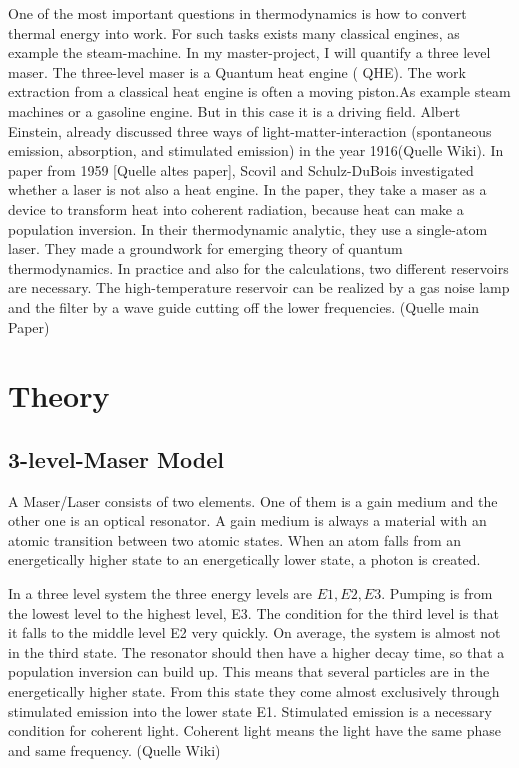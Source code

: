 \documentclass[12pt,a4paper]{article}
\begin{document}
One of the most important questions in thermodynamics is how to convert
thermal energy into work. For such tasks exists many classical engines, as
example the steam-machine. %
 In my master-project, I will quantify a three level maser.
The three-level maser is a Quantum heat engine ( QHE). The work
extraction from a classical heat engine is often a moving piston.As example steam machines or a gasoline engine. But in this case
it is a driving field. Albert Einstein, already discussed three ways of
light-matter-interaction (spontaneous emission, absorption, and stimulated
emission) in the year 1916(Quelle Wiki). In paper from 1959 [Quelle
altes paper], Scovil and Schulz-DuBois investigated whether a laser is not
also a heat engine. In the paper, they take a maser as a device to transform
heat into coherent radiation, because heat can make a population inversion.
In their thermodynamic analytic, they use a single-atom laser. They made a
groundwork for emerging theory of quantum thermodynamics. In practice and also for the calculations, two different reservoirs are necessary. The high-temperature reservoir can be
realized by a gas noise lamp and the filter by a wave guide cutting off the
lower frequencies. (Quelle main Paper)

\section{Theory}
\subsection{3-level-Maser Model}
A Maser/Laser consists of two elements. One of them is a gain medium and the other one is an optical resonator. A gain medium is always a material with an atomic transition between two atomic states. When an atom falls from an energetically higher state to an energetically lower state, a photon is created.

In a three level system the three energy levels are $E1,E2,E3$. Pumping is from the lowest level to the highest level, E3. The condition for the third level is that it falls to the middle level E2 very quickly. On average, the system is almost not in the third state. The resonator should then have a higher decay time, so that a population inversion can build up. This means that several particles are in the energetically higher state. From this state they come almost exclusively through stimulated emission into the lower state E1. Stimulated emission is a necessary condition for coherent light. Coherent light means the light have the same phase and same frequency. (Quelle Wiki)
\end{document}
